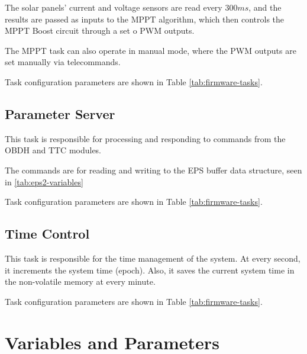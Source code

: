The solar panels' current and voltage sensors are read every \(300 ms\), and the results are passed as inputs to the MPPT algorithm, which then controls the MPPT Boost circuit through a set o PWM outputs.

The MPPT task can also operate in manual mode, where the PWM outputs are set manually via telecommands.

Task configuration parameters are shown in Table \ref{tab:firmware-tasks}.

\subsection{Parameter Server}

This task is responsible for processing and responding to commands from the OBDH and TTC modules.

The commands are for reading and writing to the EPS buffer data structure, seen in \autoref{tab:eps2-variables}

Task configuration parameters are shown in Table \ref{tab:firmware-tasks}.

\subsection{Time Control}

This task is responsible for the time management of the system.
At every second, it increments the system time (epoch).
Also, it saves the current system time in the non-volatile memory at every minute.

Task configuration parameters are shown in Table \ref{tab:firmware-tasks}.





\section{Variables and Parameters}

